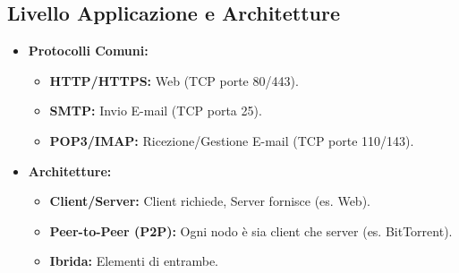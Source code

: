 \subsection{Livello Applicazione e Architetture}
\begin{itemize}
    \item \textbf{Protocolli Comuni:}
        \begin{itemize}
            \item \textbf{HTTP/HTTPS:} Web (TCP porte 80/443).
            \item \textbf{SMTP:} Invio E-mail (TCP porta 25).
            \item \textbf{POP3/IMAP:} Ricezione/Gestione E-mail (TCP porte 110/143).
        \end{itemize}
    \item \textbf{Architetture:}
        \begin{itemize}
            \item \textbf{Client/Server:} Client richiede, Server fornisce (es. Web).
            \item \textbf{Peer-to-Peer (P2P):} Ogni nodo è sia client che server (es. BitTorrent).
            \item \textbf{Ibrida:} Elementi di entrambe.
        \end{itemize}
\end{itemize}

